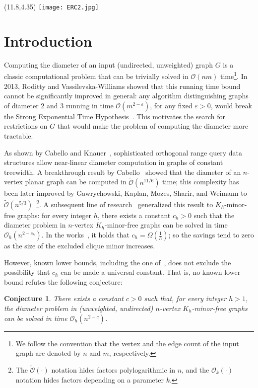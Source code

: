 \documentclass[11pt,a4paper]{article}
\newtheorem{conjecture}[lemma]{Conjecture}
\newcommand{\Oh}{\mathcal{O}}
\begin{document}
\begin{textblock}{20}(11.8,4.35)
  \texttt{[image: ERC2.jpg]}
\end{textblock}


\section{Introduction}

Computing the diameter of an input (undirected, unweighted) graph $G$ is a classic computational 
problem that can be trivially solved in $\Oh(nm)$ time\footnote{We follow the convention that the vertex and the edge count of the input graph are denoted by $n$ and $m$, respectively.}.
In 2013, Roditty and Vassilevska-Williams showed that this running
time bound cannot be significantly improved in general:
any algorithm distinguishing graphs of diameter $2$ and $3$
running in time $\Oh(m^{2-\varepsilon})$, for any fixed $\varepsilon > 0$,
would break the Strong Exponential Time Hypothesis~\cite{RodittyW13}. 
This motivates the search for restrictions on $G$ that would make the  problem of computing the diameter more tractable.

As shown by Cabello and Knauer~\cite{CabelloK09}, sophisticated orthogonal range query data structures allow near-linear diameter
computation in graphs of constant treewidth.
A breakthrough result by Cabello~\cite{Cabello19} showed that 
the diameter of an $n$-vertex planar graph can be computed in $\widetilde{\Oh}(n^{11/6})$ time;
this complexity has been later improved by Gawrychowski, Kaplan, Mozes, Sharir, and Weimann to
$\widetilde{\Oh}(n^{5/3})$~\cite{GawrychowskiKMS21}\footnote{The $\widetilde{\Oh}(\cdot)$ notation hides factors polylogarithmic in $n$, and the $\Oh_k(\cdot)$ notation hides factors depending on a parameter $k$.}.
A subsequent line of research~\cite{DucoffeHV22,DurajKP23,LeW24}
generalized this result to $K_h$-minor-free graphs:
for every integer $h$, there exists a constant $c_h > 0$ such that the diameter
problem in $n$-vertex $K_h$-minor-free graphs can be solved in time $\Oh_h(n^{2-c_h})$. 
In the works~\cite{DurajKP23,LeW24}, it holds that $c_h = \Omega\left(\frac{1}{h}\right)$; so the savings tend to zero as the size of the excluded clique minor increases.

However, known lower bounds, including the one of~\cite{RodittyW13}, does not exclude the possibility
that $c_h$ can be made a universal constant. That is, no known lower bound refutes
the following conjecture:
\begin{conjecture}\label{conj:taunt}
There exists a constant $c > 0$ such that,
for every integer $h > 1$, the diameter problem in (unweighted, undirected) $n$-vertex
$K_h$-minor-free graphs can be solved in time $\Oh_h(n^{2-c})$. 
\end{conjecture}
\end{document}
